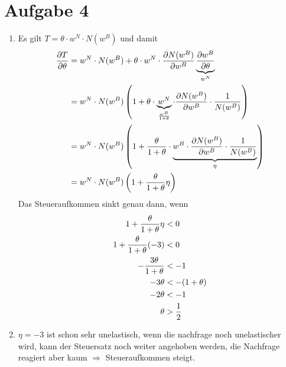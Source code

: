 \documentclass{article}
\begin{document}
	\section*{Aufgabe 4}
	\begin{enumerate}[label=(\alph*)]
		\item Es gilt $T=\theta\cdot w^N\cdot N(w^B)$ und damit
		\begin{align}
			\frac{\partial T}{\partial\theta} &= w^N\cdot N(w^B) + \theta\cdot w^N\cdot\frac{\partial N(w^B)}{\partial w^B}\underbrace{\frac{\partial w^B}{\partial \theta}}_{w^N} \notag \\
			&= w^N\cdot N(w^B)\left(1+\theta\cdot \underbrace{w^N}_{\frac{w^B}{1+\theta}} \cdot \frac{\partial N(w^B)}{\partial w^B}\cdot\frac{1}{N(w^B)}\right) \notag \\
			&= w^N\cdot N(w^B)\left(1+\frac{\theta}{1+\theta}\cdot \underbrace{w^B\cdot\frac{\partial N(w^B)}{\partial w^B}\cdot\frac{1}{N(w^B)}}_{\eta}\right) \notag \\
			&= w^N\cdot N(w^B)\left(1+\frac{\theta}{1+\theta}\eta\right) \notag
		\end{align}
		Das Steueraufkommen sinkt genau dann, wenn
		\begin{align}
			1+\frac{\theta}{1+\theta}\eta &< 0 \notag \\
			1+\frac{\theta}{1+\theta}(-3) &< 0 \notag \\
			-\frac{3\theta}{1+\theta} &< -1 \notag \\
			-3\theta &< -(1+\theta) \notag \\
			-2\theta &< -1 \notag \\
			\theta &> \frac{1}{2} \notag
		\end{align}
		\item $\eta=-3$ ist schon sehr unelastisch, wenn die nachfrage noch unelastischer wird, kann der Steuersatz noch weiter angehoben werden, die Nachfrage reagiert aber kaum $\Rightarrow$ Steueraufkommen steigt.
	\end{enumerate}
\end{document}
